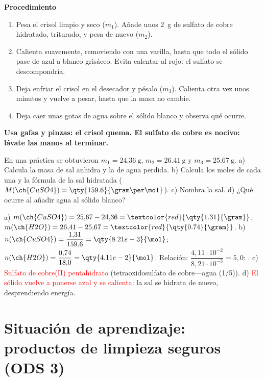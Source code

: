 \textbf{Procedimiento}
\begin{enumerate}[label=\numberballgreen]
    \item Pesa el crisol limpio y seco (\(m_1\)). Añade unos \qty{2}{\gram} de sulfato de cobre hidratado, triturado, y pesa
    de nuevo (\(m_2\)).
    \item Calienta suavemente, removiendo con una varilla, hasta que todo el sólido pase de azul a blanco grisáceo. Evita
    calentar al rojo: el sulfato se descompondría.
    \item Deja enfriar el crisol en el desecador y pésalo (\(m_3\)). Calienta otra vez unos minutos y vuelve a pesar, hasta que
    la masa no cambie.
    \item Deja caer unas gotas de agua sobre el sólido blanco y observa qué ocurre.
\end{enumerate}
\textbf{Usa gafas y pinzas: el crisol quema. El sulfato de cobre es nocivo: lávate las manos al terminar.}

\begin{exercise}
    En una práctica se obtuvieron \(m_1 = \qty{24.36}{\gram}\), \(m_2 = \qty{26.41}{\gram}\) y \(m_3 = \qty{25.67}{\gram}\).
    a) Calcula la masa de sal anhidra y la de agua perdida. b) Calcula los moles de cada una y la fórmula de la sal hidratada
    (\(M(\ch{CuSO4}) = \qty{159.6}{\gram\per\mol}\)). c) Nombra la sal. d) ¿Qué ocurre al añadir agua al sólido blanco?
    \begin{solu}
        a) \(m(\ch{CuSO4}) = 25{,}67 - 24{,}36 = \textcolor{red}{\qty{1.31}{\gram}}\); \(m(\ch{H2O}) = 26{,}41 - 25{,}67 =
        \textcolor{red}{\qty{0.74}{\gram}}\). b) \(n(\ch{CuSO4}) = \dfrac{1{,}31}{159{,}6} = \qty{8.21e-3}{\mol}\);
        \(n(\ch{H2O}) = \dfrac{0{,}74}{18{,}0} = \qty{4.11e-2}{\mol}\). Relación: \(\dfrac{4{,}11 \cdot 10^{-2}}{8{,}21 \cdot
        10^{-3}} = 5{,}0\): \textcolor{red}{}. c) \textcolor{red}{Sulfato de cobre(II) pentahidrato}
        (tetraoxidosulfato de cobre---agua (1/5)). d) \textcolor{red}{El sólido vuelve a ponerse azul y se calienta}: la sal se
        hidrata de nuevo, desprendiendo energía.
    \end{solu}
\end{exercise}

\section{Situación de aprendizaje: productos de limpieza seguros (ODS 3)}\label{sec:ud5-ods}

